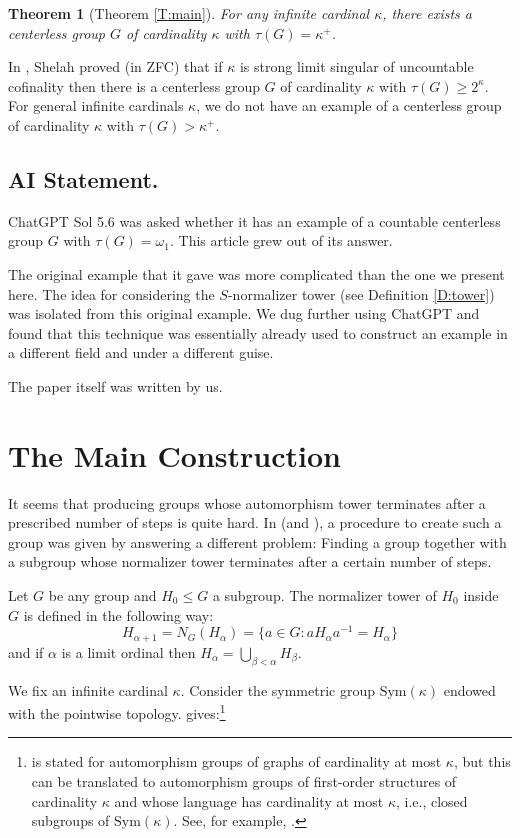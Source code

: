 \documentclass[11pt]{amsart}
\theoremstyle{plain}
\newtheorem*{theorem*}{Theorem}
\theoremstyle{definition}
\newcounter{step}
\begin{document}
\begin{theorem*}[Theorem \ref{T:main}]
For any infinite cardinal $\kappa$, there exists a centerless group $G$ of cardinality $\kappa$ with $\tau(G)=\kappa^+$.
\end{theorem*}


In \cite{Sh:810}, Shelah proved (in ZFC) that if $\kappa$ is  strong limit singular of uncountable cofinality then there is a centerless group $G$ of cardinality $\kappa$ with $\tau(G)\geq 2^\kappa$. For general infinite cardinals $\kappa$, we do not have an example of a centerless group of cardinality $\kappa$ with $\tau(G)>\kappa^+$. 


\subsection*{AI Statement.}  ChatGPT Sol 5.6 was asked whether it has an example of a countable centerless group $G$ with $\tau(G)=\omega_1$. This article grew out of its answer.

The original example that it gave was more complicated than the one we present here. 
The idea for considering the $S$-normalizer tower (see Definition \ref{D:tower}) was isolated from this original example. 
We dug further using ChatGPT and found that this technique was essentially already used to construct an example in a different field and under a different guise.

The paper itself was written by us.


\section{The Main Construction}
It seems that producing groups whose automorphism tower terminates after a prescribed number of steps is quite hard. In \cite{Thomas} (and \cite{JuShTh}), a procedure to create such a group was given by answering a different problem: Finding a group together with a subgroup whose normalizer tower terminates after a certain number of steps. 



Let $G$ be any group and $H_0\leq G$ a subgroup. The normalizer tower of $H_0$ inside $G$ is defined in the following way: \[H_{\alpha+1}=N_G(H_\alpha)=\{a\in G: aH_\alpha a^{-1}=H_\alpha\}\] and if $\alpha$ is a limit ordinal then $H_\alpha=\bigcup_{\beta<\alpha} H_\beta$. 

We fix an infinite cardinal $\kappa$. Consider the symmetric group $\mathrm{Sym}(\kappa)$ endowed with the pointwise topology. 
\cite[Lemma 1.8]{JuShTh} gives:\footnote{\cite[Lemma 1.8]{JuShTh} is stated for automorphism groups of graphs of cardinality at most $\kappa$, but this can be translated to automorphism groups of first-order structures of cardinality $\kappa$ and whose language has cardinality at most $\kappa$, i.e., closed subgroups of $\mathrm{Sym}(\kappa)$. See, for example, \cite[Theorem 4.1.9]{ThomasBook}.}
\end{document}

